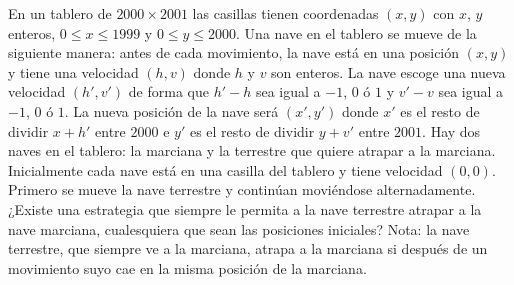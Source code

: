 En un tablero de $2000 \times 2001$ las casillas tienen coordenadas $(x,y)$ con $x$, $y$ enteros, $0 \leq x \leq 1999$ y $0 \leq y \leq 2000$. Una nave en el tablero se mueve de la siguiente manera: antes de cada movimiento, la nave está en una posición $(x,y)$ y tiene una velocidad $(h,v)$ donde $h$ y $v$ son enteros. La nave escoge una nueva velocidad $(h',v')$ de forma que $h' - h$ sea igual a $-1$, $0$ ó $1$ y $v'- v$ sea igual a $-1$, $0$ ó $1$. La nueva posición de la nave será $(x',y')$ donde $x'$ es el resto de dividir $x+h'$ entre $2000$ e $y'$ es el resto de dividir $y + v'$ entre $2001$. \newline 
Hay dos naves en el tablero: la marciana y la terrestre que quiere atrapar a la marciana. Inicialmente cada nave está en una casilla del tablero y tiene velocidad $(0,0)$. Primero se mueve la nave terrestre y continúan moviéndose alternadamente. \newline 
¿Existe una estrategia que siempre le permita a la nave terrestre atrapar a la nave marciana, cualesquiera que sean las posiciones iniciales? \newline 
Nota: la nave terrestre, que siempre ve a la marciana, atrapa a la marciana si después de un movimiento suyo cae en la misma posición de la marciana.
